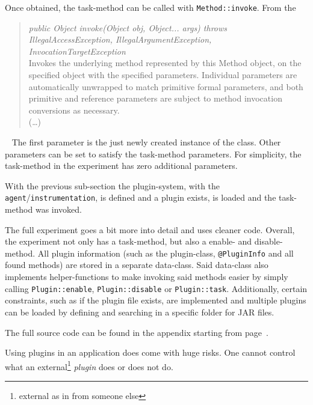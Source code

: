 Once obtained, the task-method can be called with \lstinline{Method::invoke}.
From the \textcite{javadoc:method}
\begin{quote}
    \textit{public Object invoke(Object obj, Object... args) throws IllegalAccessException, IllegalArgumentException, InvocationTargetException}\\
    Invokes the underlying method represented by this Method object, on the specified object with the specified parameters. Individual parameters are automatically unwrapped to match primitive formal parameters, and both primitive and reference parameters are subject to method invocation conversions as necessary.\\
    (\dots)
\end{quote}~\parencite{javadoc:method}
The first parameter is the just newly created instance of the class.
Other parameters can be set to satisfy the task-method parameters.
For simplicity, the task-method in the experiment has zero additional parameters.

With the previous sub-section the plugin-system, with the \texttt{agent}/\lstinline{instrumentation}, is defined and a plugin exists, is loaded and the task-method was invoked.

The full experiment goes a bit more into detail and uses cleaner code.
Overall, the experiment not only has a task-method, but also a enable- and disable-method.
All plugin information (such as the plugin-class, \lstinline{@PluginInfo} and all found methods) are stored in a separate data-class.
Said data-class also implements helper-functions to make invoking said methods easier by simply calling \lstinline{Plugin::enable}, \lstinline{Plugin::disable} or \lstinline{Plugin::task}.
Additionally, certain constraints, such as if the plugin file exists, are implemented and multiple plugins can be loaded by defining and searching in a specific folder for JAR files.

The full source code can be found in the appendix starting from page~\pageref{subsec:Experiment Source Code}.

Using plugins in an application does come with huge risks.
One cannot control what an external\footnote{external as in from someone else} \textit{plugin} does or does not do.

